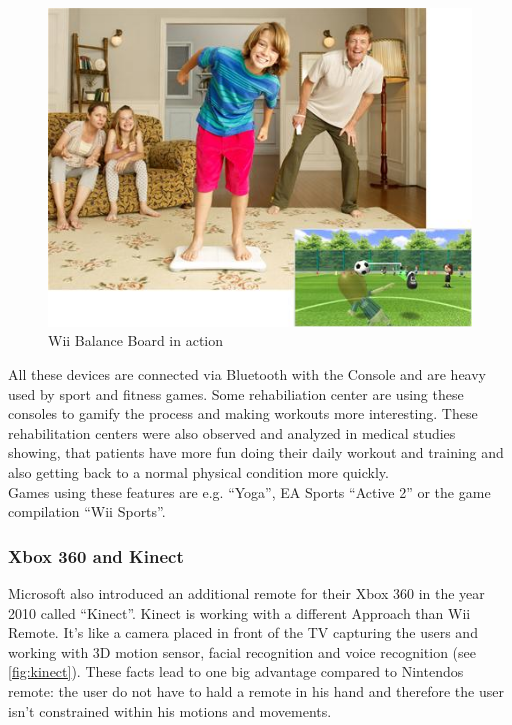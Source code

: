 \documentclass[a4paper,11pt]{article}
\begin{document}
\begin{figure}[ht]
\begin{center}
\includegraphics[width=12cm]{images/stateoftheart/wiiboard.jpg}
\caption{Wii Balance Board in action}
\label{fig:wiiboard}
\end{center}
\end{figure}

All these devices are connected via Bluetooth with the Console and are heavy used by sport and fitness games. Some rehabiliation center are using these consoles to gamify the process and making workouts more interesting. These rehabilitation centers were also observed and analyzed in medical studies showing, that patients have more fun doing their daily workout and training and also getting back to a normal physical condition more quickly. \\

Games using these features are e.g. ``Yoga'', EA Sports ``Active 2'' or the game compilation ``Wii Sports''. \\

\subsubsection{Xbox 360 and Kinect}
\label{sect:star:kinect}
Microsoft also introduced an additional remote for their Xbox 360 in the year 2010 called ``Kinect''. Kinect is working with a different Approach than Wii Remote. It's like a camera placed in front of the TV capturing the users and working with 3D motion sensor, facial recognition and voice recognition (see \ref{fig:kinect}). These facts lead to one big advantage compared to Nintendos remote: the user do not have to hald a remote in his hand and therefore the user isn't constrained within his motions and movements. \\
\end{document}
